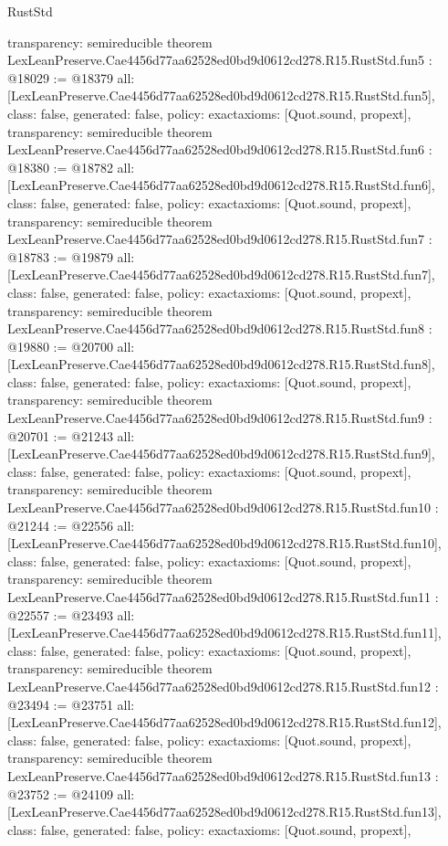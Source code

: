\begin{lexlean}{RustStd}
\begin{coremodule}
{  transparency: semireducible
}
theorem LexLeanPreserve.Cae4456d77aa62528ed0bd9d0612cd278.R15.RustStd.fun5 : @18029 := @18379 {
  all: [LexLeanPreserve.Cae4456d77aa62528ed0bd9d0612cd278.R15.RustStd.fun5],
  class: false,
  generated: false,
  policy: exact{axioms: [Quot.sound, propext]},
  transparency: semireducible
}
theorem LexLeanPreserve.Cae4456d77aa62528ed0bd9d0612cd278.R15.RustStd.fun6 : @18380 := @18782 {
  all: [LexLeanPreserve.Cae4456d77aa62528ed0bd9d0612cd278.R15.RustStd.fun6],
  class: false,
  generated: false,
  policy: exact{axioms: [Quot.sound, propext]},
  transparency: semireducible
}
theorem LexLeanPreserve.Cae4456d77aa62528ed0bd9d0612cd278.R15.RustStd.fun7 : @18783 := @19879 {
  all: [LexLeanPreserve.Cae4456d77aa62528ed0bd9d0612cd278.R15.RustStd.fun7],
  class: false,
  generated: false,
  policy: exact{axioms: [Quot.sound, propext]},
  transparency: semireducible
}
theorem LexLeanPreserve.Cae4456d77aa62528ed0bd9d0612cd278.R15.RustStd.fun8 : @19880 := @20700 {
  all: [LexLeanPreserve.Cae4456d77aa62528ed0bd9d0612cd278.R15.RustStd.fun8],
  class: false,
  generated: false,
  policy: exact{axioms: [Quot.sound, propext]},
  transparency: semireducible
}
theorem LexLeanPreserve.Cae4456d77aa62528ed0bd9d0612cd278.R15.RustStd.fun9 : @20701 := @21243 {
  all: [LexLeanPreserve.Cae4456d77aa62528ed0bd9d0612cd278.R15.RustStd.fun9],
  class: false,
  generated: false,
  policy: exact{axioms: [Quot.sound, propext]},
  transparency: semireducible
}
theorem LexLeanPreserve.Cae4456d77aa62528ed0bd9d0612cd278.R15.RustStd.fun10 : @21244 := @22556 {
  all: [LexLeanPreserve.Cae4456d77aa62528ed0bd9d0612cd278.R15.RustStd.fun10],
  class: false,
  generated: false,
  policy: exact{axioms: [Quot.sound, propext]},
  transparency: semireducible
}
theorem LexLeanPreserve.Cae4456d77aa62528ed0bd9d0612cd278.R15.RustStd.fun11 : @22557 := @23493 {
  all: [LexLeanPreserve.Cae4456d77aa62528ed0bd9d0612cd278.R15.RustStd.fun11],
  class: false,
  generated: false,
  policy: exact{axioms: [Quot.sound, propext]},
  transparency: semireducible
}
theorem LexLeanPreserve.Cae4456d77aa62528ed0bd9d0612cd278.R15.RustStd.fun12 : @23494 := @23751 {
  all: [LexLeanPreserve.Cae4456d77aa62528ed0bd9d0612cd278.R15.RustStd.fun12],
  class: false,
  generated: false,
  policy: exact{axioms: [Quot.sound, propext]},
  transparency: semireducible
}
theorem LexLeanPreserve.Cae4456d77aa62528ed0bd9d0612cd278.R15.RustStd.fun13 : @23752 := @24109 {
  all: [LexLeanPreserve.Cae4456d77aa62528ed0bd9d0612cd278.R15.RustStd.fun13],
  class: false,
  generated: false,
  policy: exact{axioms: [Quot.sound, propext]},
}
\end{coremodule}
\end{lexlean}
